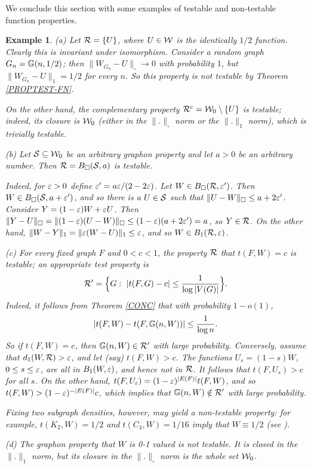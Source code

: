 \documentclass{article}
\newtheorem{example}[theorem]{Example}
\begin{document}
We conclude this section with some examples of testable and
non-testable function properties.

\begin{example}\label{TEST-FN-EX0}
(a) Let $\mathcal{R}=\{U\}$, where $U\in\mathcal{W}$ is the identically $1/2$
function. Clearly this is invariant under isomorphism. Consider a
random graph $G_n={\mathbb G}(n,1/2)$; then $\|W_{G_n}-U\|_\square\to 0$ with
probability $1$, but $\|W_{G_n}-U\|_1=1/2$ for every $n$. So this
property is not testable by Theorem \ref{PROPTEST-FN}.

On the other hand, the complementary property $\mathcal{R}^c=\mathcal{W}_0\setminus
\{U\}$ is testable; indeed, its closure is $\mathcal{W}_0$ (either in the
$\|.\|_\square$ norm or the $\|.\|_1$ norm), which is trivially
testable.

\smallskip

(b) Let $\mathcal{S}\subseteq\mathcal{W}_0$ be an arbitrary graphon property and let
$a>0$ be an arbitrary number. Then $\mathcal{R}=B_\square(\mathcal{S}, a)$ is
testable.

Indeed, for $\varepsilon>0$ define $\varepsilon'=a\varepsilon/(2-2\varepsilon)$. Let $W\in
B_\square(\mathcal{R},\varepsilon')$. Then $W\in B_\square(\mathcal{S},a+\varepsilon')$, and so
there is a $U\in \mathcal{S}$ such that $\|U-W\|_\square\le a+2\varepsilon'$.
Consider $Y=(1-\varepsilon)W+\varepsilon U$. Then $\|Y-U\|_\square =
\|(1-\varepsilon)(U-W)\|_\square \le (1-\varepsilon)(a+2\varepsilon') = a$, so $Y\in \mathcal{R}$.
On the other hand, $\|W-Y\|_1 =\|\varepsilon(W-U)\|_1 \le\varepsilon$, and so $W\in
B_1(\mathcal{R},\varepsilon)$.

\smallskip

(c) For every fixed graph $F$ and $0< c< 1$, the property $\mathcal{R}$ that
$t(F,W)=c$ is testable; an appropriate test property is
\begin{equation}\label{T-TEST}
\mathcal{R}'=\Bigl\{G:~|t(F,G)-c|\le \frac1{\log |V(G)|}\Bigr\}.
\end{equation}
Indeed, it follows from Theorem \ref{CONC} that with probability
$1-o(1)$,
\[
|t(F,W)-t(F,{\mathbb G}(n,W))|\le \frac1{\log n}.
\]
So if $t(F,W)=c$, then ${\mathbb G}(n,W)\in\mathcal{R}'$ with large probability.
Conversely, assume that $d_1(W,\mathcal{R})>\varepsilon$, and let (say) $t(F,W)>c$.
The functions $U_s=(1-s)W$, $0\le s\le\varepsilon$, are all in
$B_1(W,\varepsilon)$, and hence not in $\mathcal{R}$. It follows that $t(F,U_s)>c$
for all $s$. On the other hand,
$t(F,U_\varepsilon)=(1-\varepsilon)^{|E(F)|}t(F,W)$, and so
$t(F,W)>(1-\varepsilon)^{-|E(F)|}c$, which implies that ${\mathbb G}(n,W)\notin\mathcal{R}'$
with large probability.

Fixing two subgraph densities, however, may yield a non-testable
property: for example, $t(K_2,W)=1/2$ and $t(C_4,W)=1/16$ imply that
$W\equiv 1/2$ (see \cite{BCLSV0}).

\smallskip

(d) The graphon property that $W$ is 0-1 valued is not testable. It
is closed in the $\|.\|_1$ norm, but its closure in the
$\|.\|_\square$ norm is the whole set $\mathcal{W}_0$.
\end{example}
\end{document}
